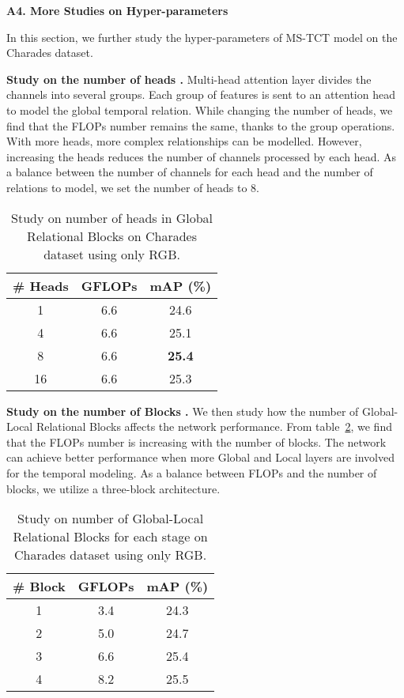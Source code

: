 \documentclass[10pt,twocolumn,letterpaper]{article}
\begin{document}
\vspace{0.1in}
\noindent \textbf{\large{A4. More Studies on Hyper-parameters}}
\vspace{0.1in}

In this section, we further study the hyper-parameters of MS-TCT model on the Charades dataset. 

\noindent\textbf{Study on the number of heads .}
Multi-head attention layer divides the channels into several groups. Each group of features is sent to an attention head to model the global temporal relation. 
While changing the number of heads, we find that the FLOPs number remains the same, thanks to the group operations. With more heads, more complex relationships can be modelled. However, increasing the heads reduces the number of channels processed by each head. 
As a balance between the number of channels for each head and the number of relations to model, we set the number of heads  to 8. 

\begin{table}[h]
\caption{Study on number of heads in Global Relational Blocks on Charades dataset using only RGB. }
\label{tab:head}
\begin{tabular}{cc|c}
\hline
\# Heads  & GFLOPs & mAP (\%) \\\hline
1     &6.6 & 24.6 \\
4     &6.6 & 25.1 \\
8     &6.6 & \textbf{25.4} \\
16    &6.6 & 25.3 \\\hline
\end{tabular}
\end{table}


\noindent\textbf{Study on the number of Blocks .}
We then study how the number of Global-Local Relational Blocks  affects the network performance. From table~\ref{tab:block}, we find that the FLOPs number is increasing with the number of blocks. The network can achieve better performance when more Global and Local layers are involved for the temporal modeling.
As a balance between FLOPs and the number of blocks, we utilize a three-block architecture. 

\begin{table}[t]
\caption{Study on number of Global-Local Relational Blocks for each stage on Charades dataset using only RGB.}
\label{tab:block}
\begin{tabular}{cc|c}
\hline
\# Block  & GFLOPs & mAP (\%)      \\\hline
1       &3.4 & 24.3    \\
2       &5.0 & 24.7   \\
3       &6.6 & 25.4      \\
4       &8.2 & 25.5      \\\hline
\end{tabular}
\end{table}
\end{document}
